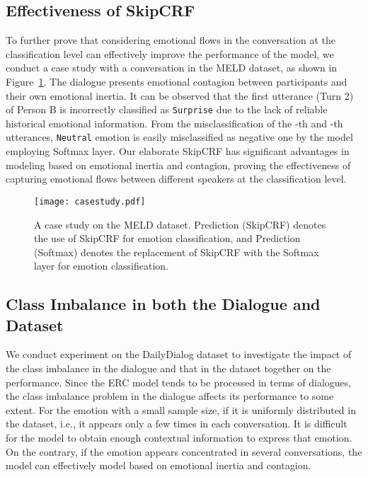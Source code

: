 \documentclass{SCIS2019}
\begin{document}
\subsection{Effectiveness of SkipCRF}
To further prove that considering emotional flows in the conversation at the classification level can effectively improve the performance of the model, we conduct a case study with a conversation in the MELD dataset, as shown in Figure~\ref{fig:casestudy}. 
The dialogue presents emotional contagion between participants and their own emotional inertia. It can be observed that the first utterance (Turn 2) of Person B is incorrectly classified as \texttt{Surprise} due to the lack of reliable historical emotional information. From the misclassification of the -th and -th utterances, \texttt{Neutral} emotion is easily misclassified as negative one by the model employing Softmax layer. Our elaborate SkipCRF has significant advantages in modeling based on emotional inertia and contagion, proving the effectiveness of capturing emotional flows between different speakers at the classification level.
\begin{figure}[htbp]
	\centering
	\texttt{[image: casestudy.pdf]}
	\caption{A case study on the MELD dataset. Prediction (SkipCRF) denotes the use of SkipCRF for emotion classification, and Prediction (Softmax) denotes the replacement of SkipCRF with the Softmax layer for emotion classification.}
	\label{fig:casestudy}
\end{figure}

\subsection{Class Imbalance in both the Dialogue and Dataset}
We conduct experiment on the DailyDialog dataset to investigate the impact of the class imbalance in the dialogue and that in the dataset together on the performance. Since the ERC model tends to be processed in terms of dialogues, the class imbalance problem in the dialogue affects its performance to some extent. For the emotion with a small sample size, if it is uniformly distributed in the dataset, i.e., it appears only a few times in each conversation. It is difficult for the model to obtain enough contextual information to express that emotion. On the contrary, if the emotion appears concentrated in several conversations, the model can effectively model based on emotional inertia and contagion.
\end{document}
